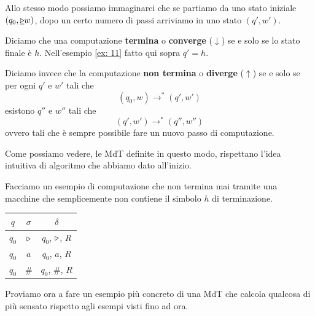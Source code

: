 Allo stesso modo possiamo immaginarci che se partiamo da uno
stato iniziale $(q_0, \underline{\triangleright} w)$, dopo un certo
numero di passi arriviamo in uno stato $(q', w')$.

\begin{definition} \label{def: convergenza}
	Diciamo che una computazione \textbf{termina} o
	\textbf{converge} ($\downarrow$) se e solo se lo stato
	finale è $h$. Nell'esempio \ref{ex: 11} fatto qui sopra
	$q' = h$.

	Diciamo invece che la computazione \textbf{non termina}
	o \textbf{diverge} ($\uparrow$) se e solo se per ogni
	$q'$ e $w'$ tali che
	\[ (q_0, w) \to^* (q', w') \]
	esistono $q''$ e $w''$ tali che
	\[ (q', w') \to^* (q'', w'') \]
	ovvero tali che è sempre possibile fare un nuovo passo di
	computazione.
\end{definition}

Come possiamo vedere, le MdT definite in questo modo,
rispettano l'idea intuitiva di algoritmo che abbiamo dato
all'inizio.

\begin{example}
	Facciamo un esempio di computazione che non termina mai
	tramite una macchine che semplicemente non contiene il
	simbolo $h$ di terminazione.
	\begin{center}
		\begin{tabular}{|c|c|c|}
			\hline
			$q$   & $\sigma$ & $\delta$             \\
			\hline
			$q_0$ & $\triangleright$ & $q_0$, $\triangleright$, $R$ \\
			$q_0$ & $a$      & $q_0$, $a$, $R$      \\
			$q_0$ & $\#$     & $q_0$, $\#$, $R$     \\
			\hline
		\end{tabular}
	\end{center}
\end{example}

Proviamo ora a fare un esempio più concreto di una MdT che
calcola qualcosa di più sensato rispetto agli esempi visti
fino ad ora.


